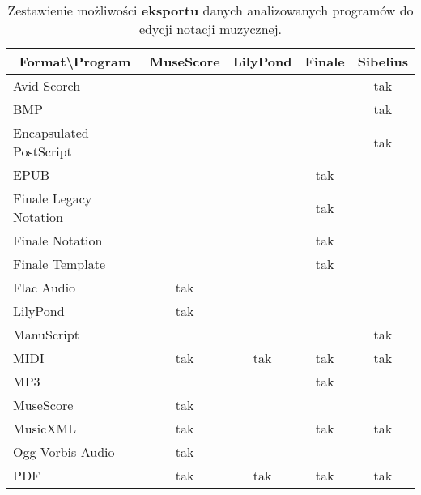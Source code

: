 \begin{center}
\begin{longtable}{|l|c|c|c|c|}
\caption{Zestawienie możliwości \textbf{eksportu} danych analizowanych programów do edycji notacji muzycznej.} \label{edytory-eksport} \\
\hline
\multicolumn{1}{|c|}{\textbf{Format{\textbackslash}Program}} & MuseScore & LilyPond & Finale & Sibelius \\ \hline
Avid Scorch                                   &           &          &        & tak      \\ \hline
BMP                                           &           &          &        & tak      \\ \hline
Encapsulated PostScript                       &           &          &        & tak      \\ \hline
EPUB                                          &           &          & tak    &          \\ \hline
Finale Legacy Notation                        &           &          & tak    &          \\ \hline
Finale Notation                               &           &          & tak    &          \\ \hline
Finale Template                               &           &          & tak    &          \\ \hline
Flac Audio                                    & tak       &          &        &          \\ \hline
LilyPond                                      & tak       &          &        &          \\ \hline
ManuScript                                    &           &          &        & tak      \\ \hline
MIDI                                          & tak       & tak      & tak    & tak      \\ \hline
MP3                                           &           &          & tak    &          \\ \hline
MuseScore                                     & tak       &          &        &          \\ \hline
MusicXML                                      & tak       &          & tak    & tak      \\ \hline
Ogg Vorbis Audio                              & tak       &          &        &          \\ \hline
PDF                                           & tak       & tak      & tak    & tak      \\ \hline

\end{longtable}
\end{center}
